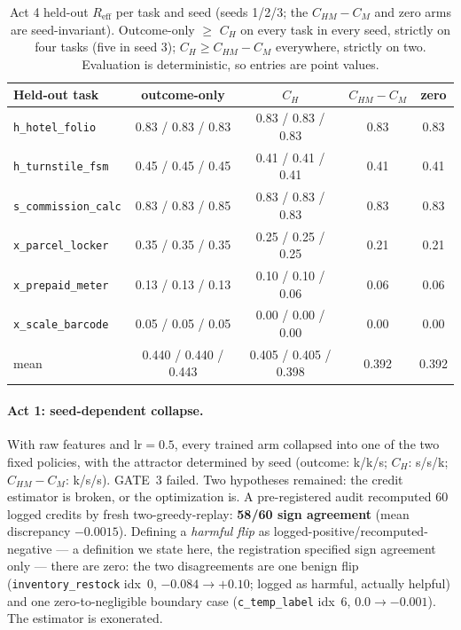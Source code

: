 \documentclass{article}
\theoremstyle{remark}
\begin{document}
\begin{table}[h]
\centering\scriptsize
\begin{tabular}{@{}lcccc@{}}
\toprule
Held-out task & outcome-only & $C_H$ & $C_{HM}-C_M$ & zero \\
\midrule
\texttt{h\_hotel\_folio} & 0.83 / 0.83 / 0.83 & 0.83 / 0.83 / 0.83 & 0.83 & 0.83 \\
\texttt{h\_turnstile\_fsm} & 0.45 / 0.45 / 0.45 & 0.41 / 0.41 / 0.41 & 0.41 & 0.41 \\
\texttt{s\_commission\_calc} & 0.83 / 0.83 / 0.85 & 0.83 / 0.83 / 0.83 & 0.83 & 0.83 \\
\texttt{x\_parcel\_locker} & 0.35 / 0.35 / 0.35 & 0.25 / 0.25 / 0.25 & 0.21 & 0.21 \\
\texttt{x\_prepaid\_meter} & 0.13 / 0.13 / 0.13 & 0.10 / 0.10 / 0.06 & 0.06 & 0.06 \\
\texttt{x\_scale\_barcode} & 0.05 / 0.05 / 0.05 & 0.00 / 0.00 / 0.00 & 0.00 & 0.00 \\
\midrule
mean & 0.440 / 0.440 / 0.443 & 0.405 / 0.405 / 0.398 & 0.392 & 0.392 \\
\bottomrule
\end{tabular}
\caption{Act 4 held-out $R_{\text{eff}}$ per task and seed (seeds 1/2/3;
the $C_{HM}-C_M$ and zero arms are seed-invariant). Outcome-only $\geq$
$C_H$ on every task in every seed, strictly on four tasks (five in seed
3); $C_H \geq C_{HM}-C_M$ everywhere, strictly on two. Evaluation is
deterministic, so entries are point values.}
\label{tab:act4tasks}
\end{table}

\paragraph{Act 1: seed-dependent collapse.} With raw features and
$\text{lr} = 0.5$, every trained arm collapsed into one of the two fixed
policies, with the attractor determined by seed (outcome: k/k/s; $C_H$:
s/s/k; $C_{HM}-C_M$: k/s/s). GATE~3 failed. Two hypotheses
remained: the credit estimator is broken, or the optimization is. A
pre-registered audit recomputed 60 logged credits by fresh two-greedy-replay:
\textbf{58/60 sign agreement} (mean discrepancy $-0.0015$). Defining a
\emph{harmful flip} as logged-positive/recomputed-negative --- a definition
we state here, the registration specified sign agreement only --- there are
zero: the two disagreements are one benign flip
(\texttt{inventory\_restock} idx~0, $-0.084 \to +0.10$; logged as harmful,
actually helpful) and one zero-to-negligible boundary case
(\texttt{c\_temp\_label} idx~6, $0.0 \to -0.001$). The estimator is
exonerated.
\end{document}
